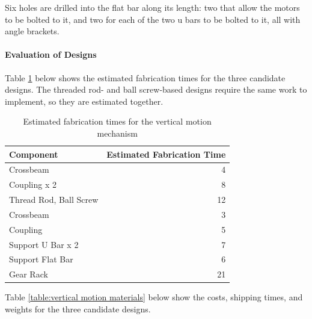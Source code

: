 \documentclass[11pt]{article}
\newcommand{\subsubsubsection}[1]{\paragraph{#1}\mbox{}}
\begin{document}
Six holes are drilled into the flat bar along its length: two that allow the motors to be bolted to it, and two for each of the two u bars to be bolted to it, all with angle brackets.

\subsubsubsection{Evaluation of Designs}

Table \ref{table:vertical motion fabrication times} below shows the estimated fabrication times for the three candidate designs.  The threaded rod- and ball screw-based designs require the same work to implement, so they are estimated together.

\begin{table}[H]
\begin{tabularx}{\textwidth}{X r}

\hline

Component & Estimated Fabrication Time \\

\hline

Crossbeam & 4 \\
Coupling x 2 & 8 \\

\hline

Thread Rod, Ball Screw & 12 \\

\hline

Crossbeam & 3 \\
Coupling & 5 \\
Support U Bar x 2 & 7 \\
Support Flat Bar & 6 \\

\hline

Gear Rack & 21 \\

\hline

\end{tabularx}
\caption{Estimated fabrication times for the vertical motion mechanism}
\label{table:vertical motion fabrication times}
\end{table}

Table \ref{table:vertical motion materials} below show the costs, shipping times, and weights for the three candidate designs.
\end{document}
